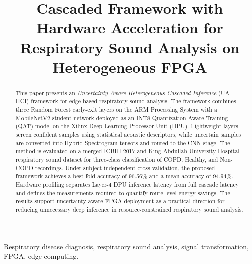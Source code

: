 \documentclass[lettersize,journal]{IEEEtran}
\begin{document}
\title{Cascaded Framework with Hardware Acceleration for Respiratory Sound Analysis on Heterogeneous FPGA}


\maketitle

\begin{abstract}
This paper presents an \textit{Uncertainty-Aware Heterogeneous Cascaded Inference} (UA-HCI) framework for edge-based respiratory sound analysis. The framework combines three Random Forest early-exit layers on the ARM Processing System with a MobileNetV2 student network deployed as an INT8 Quantization-Aware Training (QAT) model on the Xilinx Deep Learning Processor Unit (DPU). Lightweight layers screen confident samples using statistical acoustic descriptors, while uncertain samples are converted into Hybrid Spectrogram tensors and routed to the CNN stage. The method is evaluated on a merged ICBHI 2017 and King Abdullah University Hospital respiratory sound dataset for three-class classification of COPD, Healthy, and Non-COPD recordings. Under subject-independent cross-validation, the proposed framework achieves a best-fold accuracy of 96.56\% and a mean accuracy of 94.94\%. Hardware profiling separates Layer-4 DPU inference latency from full cascade latency and defines the measurements required to quantify route-level energy savings. The results support uncertainty-aware FPGA deployment as a practical direction for reducing unnecessary deep inference in resource-constrained respiratory sound analysis.
\end{abstract}

\begin{IEEEkeywords}
Respiratory disease diagnosis, respiratory sound analysis, signal transformation, FPGA, edge computing.
\end{IEEEkeywords}
\end{document}
